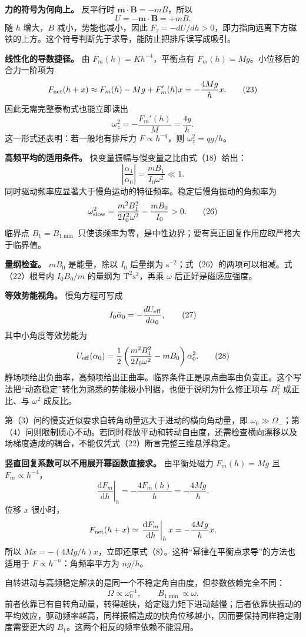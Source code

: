 \documentclass[12pt,a4paper,UTF8]{ctexart}
\begin{document}
\textbf{力的符号为何向上。} 反平行时
\(\boldsymbol m\cdot\boldsymbol B=-mB\)，所以 \[
U=-\boldsymbol m\cdot\boldsymbol B=+mB.
\] 随 \(h\) 增大，\(B\) 减小，势能也减小，因此
\(F_z=-dU/dh>0\)，即力指向远离下方磁铁的上方。这个符号判断先于求导，能防止把排斥误写成吸引。

\textbf{线性化的导数捷径。} 由 \(F_m(h)=Kh^{-4}\)，平衡点有
\(F_m(h)=Mg\)。小位移后的合力一阶项为 \[
F_{\rm net}(h+x)
\approx F_m(h)-Mg+F_m'(h)x
=-\frac{4Mg}{h}x. \tag{23}
\] 因此无需完整泰勒式也能立即读出 \[
\omega_z^2=-\frac{F_m'(h)}{M}=\frac{4g}{h}. \tag{24}
\] 这一形式还表明：若一般地有排斥力 \(F\propto h^{-q}\)，则
\(\omega_z^2=qg/h\)。

\textbf{高频平均的适用条件。} 快变量振幅与慢变量之比由式（18）给出： \[
\left|\frac{\alpha_1}{\alpha_0}\right|
=\frac{mB_1}{I_0\omega^2}\ll1. \tag{25}
\] 同时驱动频率应显著大于慢角运动的特征频率。稳定后慢角振动的角频率为 \[
\omega_{\rm slow}^2
=\frac{m^2B_1^2}{2I_0^2\omega^2}
-\frac{mB_0}{I_0}>0. \tag{26}
\] 临界点 \(B_1=B_{1\min}\)
只使该频率为零，是中性边界；要有真正回复作用应取严格大于临界值。

\textbf{量纲检查。} \(mB_0\) 是能量，除以 \(I_0\) 后量纲为
\(\mathrm{s^{-2}}\)；式（26）的两项可以相减。式（22）根号内 \(I_0B_0/m\)
的量纲为 \(\mathrm{T^2s^2}\)，再乘 \(\omega\) 后正好是磁感应强度。

\textbf{等效势能视角。} 慢角方程可写成 \[
I_0\ddot\alpha_0=-\frac{dU_{\rm eff}}{d\alpha_0}, \tag{27}
\] 其中小角度等效势能为 \[
U_{\rm eff}(\alpha_0)
=\frac12\left(
\frac{m^2B_1^2}{2I_0\omega^2}-mB_0
\right)\alpha_0^2. \tag{28}
\]
静场项给出负曲率，高频项给出正曲率。临界条件正是原点曲率由负变正。这个写法把``动态稳定''转化为熟悉的势能极小判据，也便于说明为什么修正项与
\(B_1^2\) 成正比、与 \(\omega^2\) 成反比。

第（3）问的慢支近似要求自转角动量远大于进动的横向角动量，即
\(\omega_0\gg\Omega_-\)；第（4）问则限制质心不动。若同时释放平动和转动自由度，还需检查横向漂移以及场梯度造成的耦合，不能仅凭式（22）断言完整三维悬浮稳定。

\textbf{竖直回复系数可以不用展开幂函数直接求。} 由平衡处磁力
\(F_m(h)=Mg\) 且 \(F_m\propto h^{-4}\)， \[
\left.\frac{\mathrm dF_m}{\mathrm dh}\right|_h
=-\frac{4F_m(h)}h
=-\frac{4Mg}{h}.
\] 位移 \(x\) 很小时， \[
F_{\rm net}(h+x)
\simeq\left.\frac{\mathrm dF_m}{\mathrm dh}\right|_h x
=-\frac{4Mg}{h}x,
\] 所以
\(M\ddot x=-(4Mg/h)x\)，立即还原式（8）。这种``幂律在平衡点求导''的方法也适用于
\(F\propto h^{-n}\)：角频率平方为 \(ng/h\)。

自转进动与高频稳定解决的是同一个不稳定角自由度，但参数依赖完全不同： \[
\Omega\propto\omega_0^{-1},
\qquad
B_{1\min}\propto\omega.
\]
前者依靠已有自转角动量，转得越快，给定磁力矩下进动越慢；后者依靠快振动的平均效应，驱动频率越高，同样振幅造成的快角位移越小，因而要保持同样稳定刚度需要更大的
\(B_1\)。这两个相反的频率依赖不能混用。
\end{document}
